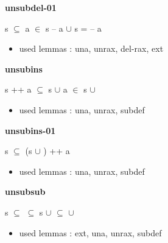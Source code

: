 \documentclass[a4paper]{article}
\begin{document}
\medskip

\bigskip

{\large\bf unsubdel-01}

\medskip

 \Fol s $\subseteq$  \And \Not a $\in$ s \Imp {} -- a $\cup$ s =  -- a

\begin{itemize}


\item       used lemmas  : una, unrax, del-rax, ext

\end{itemize}

\medskip

\bigskip

{\large\bf unsubins}

\medskip

 \Fol s ++ a $\subseteq$ s $\cup$  \Equiv a $\in$ s $\cup$ 

\begin{itemize}


\item       used lemmas  : una, unrax, subdef

\end{itemize}

\medskip

\bigskip

{\large\bf unsubins-01}

\medskip

 \Fol s $\subseteq$ (s $\cup$ ) ++ a

\begin{itemize}


\item       used lemmas  : una, unrax, subdef

\end{itemize}

\medskip

\bigskip

{\large\bf unsubsub}

\medskip

 \Fol s $\subseteq$  \And {} $\subseteq$  \Imp s $\cup$  $\subseteq$  $\cup$ 

\begin{itemize}


\item       used lemmas  : ext, una, unrax, subdef

\end{itemize}

\medskip
\end{document}
